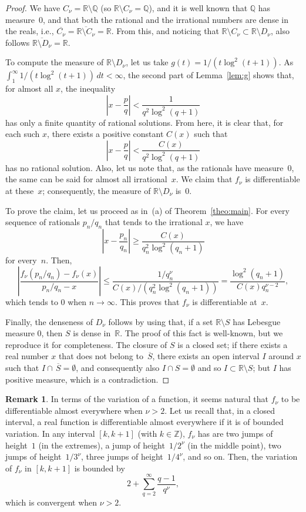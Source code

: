 \documentclass[11pt,a4paper,reqno]{amsart}
\def\R{\mathbb{R}}
\def\Q{\mathbb{Q}}
\def\Z{\mathbb{Z}}
\theoremstyle{plain}
\theoremstyle{definition}
\newtheorem{remark}{Remark}
\begin{document}
\begin{proof}
We have $C_\nu = \R \setminus \Q$ (so $\R \setminus C_\nu = \Q$), and it is well known that $\Q$ has measure~$0$, and that both the rational and the irrational numbers are dense in the reals, i.e., $\overline{C_\nu} = \overline{\R \setminus C_\nu} = \R$.
From this, and noticing that $\R \setminus C_\nu \subset \R \setminus D_\nu$,
also follows $\overline{\R \setminus D_\nu} = \R$.

To compute the measure of $\R \setminus D_\nu$, let us take $g(t) = 1/(t \log^2(t+1))$.
As $\int_1^\infty 1/(t \log^2(t+1)) \, dt < \infty$, the second part of Lemma~\ref{lem:g} shows that, for almost all $x$, the inequality
$$
  \left| x - \frac{p}{q} \right| < \frac{1}{q^2 \log^2(q+1)}
$$
has only a finite quantity of rational solutions.
From here, it is clear that, for each such $x$, there exists a positive constant $C(x)$ such that
$$
  \left| x - \frac{p}{q} \right| < \frac{C(x)}{q^2 \log^2(q+1)}
$$
has no rational solution.
Also, let us note that, as the rationals have measure~$0$, the same can be said for almost all irrational~$x$. 
We claim that $f_\nu$ is differentiable at these~$x$; consequently, the measure of $\R \setminus D_\nu$ is~$0$.

To prove the claim, let us proceed as in~(a) of Theorem~\ref{theo:main}. For every sequence of rationals ${p_n/q_n}$ that tends to the irrational $x$, we have
$$
  \left| x - \frac{p_n}{q_n} \right| \ge \frac{C(x)}{q_n^2 \log^2(q_n+1)}
$$
for every~$n$.
Then, 
$$
  \left|\frac{f_\nu(p_n/q_n) - f_\nu(x)}{p_n/q_n - x} \right| 
  \le \frac{1/q_n^\nu}{C(x)/(q_n^2 \log^2(q_n+1))} 
  = \frac{\log^2(q_n+1)}{C(x) q_n^{\nu-2}},
$$
which tends to $0$ when $n\to\infty$. This proves that $f_\nu$ is differentiable at~$x$.

Finally, the denseness of $D_\nu$ follows by using that,
if a set $\R \setminus S$ has Lebesgue measure $0$, then $S$ is dense in~$\R$.
The proof of this fact is well-known, but we reproduce it for completeness.
The closure of $S$ is a closed set; if there exists a real number $x$ that does not belong to $\,\overline{\!S}$, there exists an open interval $I$ around $x$ such that $I \cap \,\overline{\!S} = \emptyset$, and consequently also $I \cap S = \emptyset$ and so $I \subset \R \setminus S$; but $I$ has positive measure, which is a contradiction.
\end{proof}

\begin{remark}
In terms of the variation of a function, it seems natural that $f_\nu$ to be
differentiable almost everywhere when $\nu > 2$. Let us recall that, in a closed interval, a real function is differentiable almost everywhere if it is of bounded variation. In any interval $[k,k+1]$ (with $k \in \Z$), $f_\nu$ has are two jumps of height~$1$ (in the extremes), a jump of height~$1/2^\nu$ (in the middle point), two jumps of height~$1/3^\nu$, three jumps of height~$1/4^\nu$, and so on. Then, the variation of $f_\nu$ in $[k,k+1]$ is bounded by
$$
  2 + \sum_{q=2}^\infty \frac{q-1}{q^\nu},
$$
which is convergent when $\nu > 2$.
\end{remark}
\end{document}
